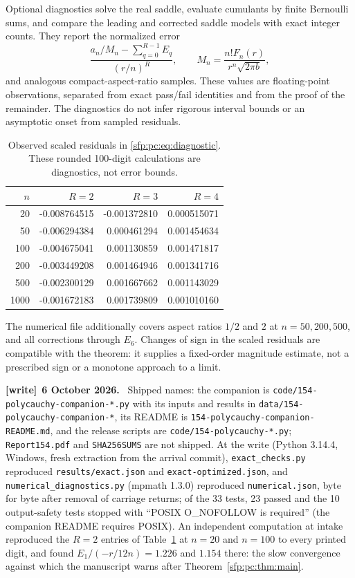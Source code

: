 \documentclass[11pt,letterpaper]{article}
\numberwithin{equation}{section}
\theoremstyle{definition}\newtheorem{definition}[theorem]{Definition}
\theoremstyle{remark}\newtheorem{remark}[theorem]{Remark}
\newcommand{\file}[1]{\nolinkurl{#1}}
\newenvironment{writenote}[1][]{\par\smallskip\begingroup\small
 \noindent\textbf{[write]}\if\relax\detokenize{#1}\relax\else~\textbf{#1.}\fi\ }%
 {\par\endgroup\smallskip}
\begin{document}
Optional diagnostics solve the real saddle, evaluate cumulants by
finite Bernoulli sums, and compare the leading and corrected saddle
models with exact integer counts. They report the normalized error
\begin{equation}\label{sfp:pc:eq:diagnostic}
 \frac{a_n/M_n-\sum_{q=0}^{R-1}E_q}{(r/n)^R},
 \qquad M_n=\frac{n!F_n(r)}{r^n\sqrt{2\pi b}},
\end{equation}
and analogous compact-aspect-ratio samples. These values are
floating-point observations, separated from exact pass/fail
identities and from the proof of the remainder. The diagnostics do
not infer rigorous interval bounds or an asymptotic onset from
sampled residuals.


\begin{table}[htbp]
\centering
\caption{Observed scaled residuals in \eqref{sfp:pc:eq:diagnostic}.
These rounded 100-digit calculations are diagnostics, not error bounds.}
\label{sfp:pc:tab:residuals}
\begin{tabular}{rrrr}
\toprule
$n$ & $R=2$ & $R=3$ & $R=4$\\
\midrule
20 & -0.008764515 & -0.001372810 & 0.000515071 \\
50 & -0.006294384 & 0.000461294 & 0.001454634 \\
100 & -0.004675041 & 0.001130859 & 0.001471817 \\
200 & -0.003449208 & 0.001464946 & 0.001341716 \\
500 & -0.002300129 & 0.001667662 & 0.001143029 \\
1000 & -0.001672183 & 0.001739809 & 0.001010160 \\
\bottomrule
\end{tabular}
\end{table}

The numerical file additionally covers aspect ratios $1/2$ and $2$
at $n=50,200,500$, and all corrections through $E_6$. Changes of
sign in the scaled residuals are compatible with the theorem:
it supplies a fixed-order magnitude estimate, not a prescribed sign
or a monotone approach to a limit.
\begin{writenote}[6 October 2026]
Shipped names: the companion is \file{code/154-polycauchy-companion-*.py} with its inputs and results in \file{data/154-polycauchy-companion-*}, its README is \file{154-polycauchy-companion-README.md}, and the release scripts are \file{code/154-polycauchy-*.py}; \file{Report154.pdf} and \file{SHA256SUMS} are not shipped. At the write (Python 3.14.4, Windows, fresh extraction from the arrival commit), \file{exact_checks.py} reproduced \file{results/exact.json} and \file{exact-optimized.json}, and \file{numerical_diagnostics.py} (mpmath 1.3.0) reproduced \file{numerical.json}, byte for byte after removal of carriage returns; of the 33 tests, 23 passed and the 10 output-safety tests stopped with ``POSIX O\_NOFOLLOW is required'' (the companion README requires POSIX). An independent computation at intake reproduced the $R=2$ entries of Table~\ref{sfp:pc:tab:residuals} at $n=20$ and $n=100$ to every printed digit, and found $E_1/(-r/12n)=1.226$ and $1.154$ there: the slow convergence against which the manuscript warns after Theorem~\ref{sfp:pc:thm:main}.
\end{writenote}
\end{document}
